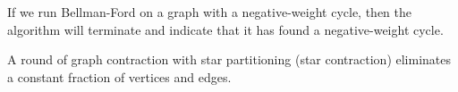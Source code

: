 \begin{parts}
\afalse

\trueorfalse

If we run Bellman-Ford on a graph with a negative-weight cycle, then
the algorithm will terminate and indicate that it has found a
negative-weight cycle.

\afalse


\trueorfalse 

A round of graph contraction with star partitioning (star contraction)
eliminates a constant fraction of vertices and edges.

\afalse



\end{parts}
